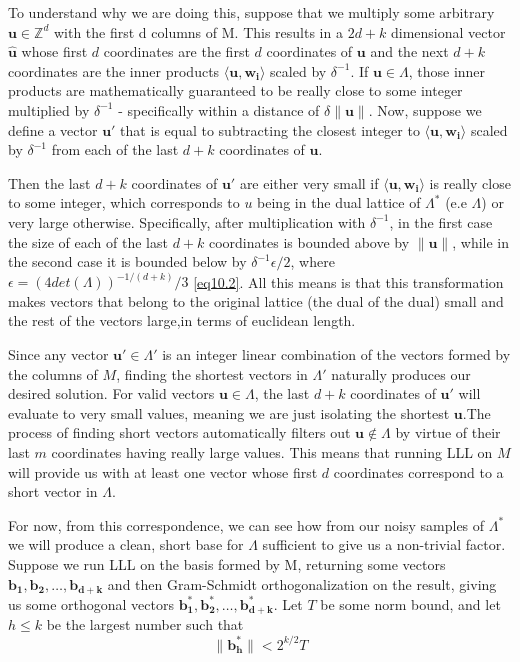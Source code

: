 To understand why we are doing this, suppose that we multiply some arbitrary $\mathbf{u} \in \mathbb{Z}^d$ with the first d columns of M. This results in a $2d+k$ dimensional vector $\mathbf{\hat{u}}$ whose first $d$ coordinates are the first $d$ coordinates of $\mathbf{u}$ and the next $d+k$ coordinates are the inner products $\langle \mathbf{u,w_i} \rangle$ scaled by $\delta^{-1}$. If $\mathbf{u} \in \Lambda$, those inner products are mathematically guaranteed to be really close to some integer multiplied by $\delta^{-1}$ - specifically within a distance of $\delta \rVert \mathbf{u} \lVert$. Now, suppose we define a vector $\mathbf{u'}$ that is equal to subtracting the closest integer to $\langle \mathbf{u,w_i} \rangle$ scaled by $\delta^{-1}$ from each of the last $d+k$ coordinates of $\mathbf{\hat{u}}$. 

Then the last $d+k$ coordinates of $\mathbf{u'}$ are either very small if $\langle \mathbf{u,w_i} \rangle$ is really close to some integer, which corresponds to $u$ being in the dual lattice of $\Lambda^*$ (e.e $\Lambda$) or very large otherwise. Specifically, after multiplication with $\delta^{-1}$, in the first case the size of each of the last $d+k$ coordinates is bounded above by $\rVert \mathbf{u} \lVert$, while in the second case it is bounded below by $\delta^{-1}\epsilon/2$, where $\epsilon = (4det(\Lambda))^{-1/(d+k)}/3$ \eqref{eq10.2}. All this means is that this transformation makes vectors that belong to the original lattice (the dual of the dual) small and the rest of the vectors large,in terms of euclidean length.

Since any vector $\mathbf{u'} \in \Lambda'$ is an integer linear combination of the vectors formed by the columns of $M$, finding the shortest vectors in $\Lambda'$ naturally produces our desired solution. For valid vectors $\mathbf{u} \in \Lambda$, the last $d+k$ coordinates of $\mathbf{u'}$ will evaluate to very small values, meaning we are just isolating the shortest $\mathbf{u}$.The process of finding short vectors automatically filters out $\mathbf{u} \notin \Lambda$ by virtue of their last $m$ coordinates having really large values. This means that running LLL on $M$ will provide us with at least one vector whose first $d$ coordinates correspond to a short vector in $\Lambda$.

For now, from this correspondence, we can see how from our noisy samples of $ \mathit \Lambda^*$ we will produce a clean, short base for $\mathit \Lambda$ sufficient to give us a non-trivial factor. Suppose we run LLL on the basis formed by M, returning some vectors $\mathbf{b_1, b_2, \dots, b_{d+k}}$ and then Gram-Schmidt orthogonalization on the result, giving us some orthogonal vectors $\mathbf{b^*_1, b^*_2, \dots, b^*_{d+k}}$. Let $T$ be some norm bound, and let $h \leq k$ be the largest number such that 
\begin{equation}
    \lVert\mathbf{b^*_h} \rVert <  2^{k/2} T
\end{equation}

